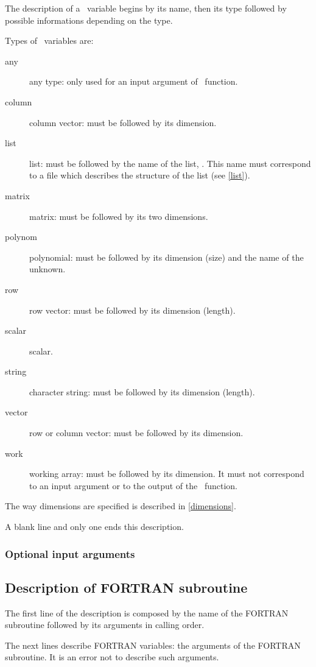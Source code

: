 The description of a \SCI\ variable begins by its name, then its type followed
by possible informations depending on the type.

Types of \SCI\ variables are:
\begin{description}
  \item[any] any type: only used for an input argument of \SCI\ function.
  \item[column] column vector: must be followed by its dimension.
  \item[list] list: must be followed by the name of the list,
. This name must correspond to a file 
which describes the structure of the list (see \ref{list}).
  \item[matrix] matrix: must be followed by its two dimensions.
  \item[polynom] polynomial: must be followed by its dimension (size) and the
name of the unknown.
  \item[row] row vector: must be followed by its dimension (length).
  \item[scalar] scalar.
  \item[string] character string: must be followed by its dimension (length).
  \item[vector] row or column vector: must be followed by its dimension.
  \item[work] working array: must be followed by its dimension. It must not
correspond to an input argument or to the output of the \SCI\ function.
\end{description}

The way dimensions are specified is described in 
\ref{dimensions}.
\smallskip

A blank line and only one ends this description.

\subsubsection{Optional input arguments}

\subsection{Description of FORTRAN subroutine}
\label{fortran}

The first line of the description is composed by the name of the 
FORTRAN subroutine
followed by its arguments in calling order.

The next lines describe FORTRAN variables: the arguments of the FORTRAN
subroutine. 
It is an error not to describe such arguments.

